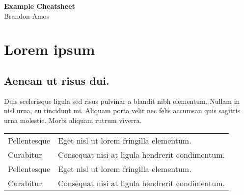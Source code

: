 \documentclass[10pt,landscape]{cheatsheet}
\begin{document}
\footnotesize
\begin{multicols}{3}

\begin{center}
     \Large{\textbf{Example Cheatsheet}} \\
     Brandon Amos
\end{center}

\section{Lorem ipsum}
\subsection{Aenean ut risus dui.}
Duis scelerisque ligula sed risus pulvinar a blandit nibh elementum. Nullam
in nisl urna, eu tincidunt mi. Aliquam porta velit nec felis accumsan quis
sagittis urna molestie. Morbi aliquam rutrum viverra.

\newcommand{\mitem}[2]{#1 & #2 \\}
\begin{tabular}{@{}ll@{}}
    \mitem{Pellentesque}{Eget nisl ut lorem fringilla elementum.}
    \mitem{Curabitur}{Consequat nisi at ligula hendrerit condimentum.}
    \hline
    \mitem{Pellentesque}{Eget nisl ut lorem fringilla elementum.}
    \mitem{Curabitur}{Consequat nisi at ligula hendrerit condimentum.}
\end{tabular}

\end{multicols}
\end{document}
